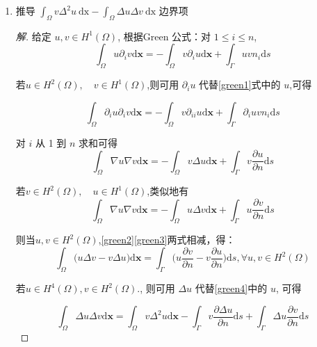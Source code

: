 \documentclass[12pt,a4paper]{article}
\begin{document}
	
	\begin{enumerate}
		\item 推导		
		$
		\displaystyle \int_\Omega v\Delta^2u\mathrm{~dx}-\displaystyle \int_\Omega\Delta u\Delta v\mathrm{~dx}
		$
		边界项
		
		\begin{proof}[解]\let\qed\relax
			给定 $u,v\in H^1(\Omega)$, 根据Green 公式：对 $1\leqslant i\leqslant n$,
			\begin{equation}
				\int_{\Omega}u\partial_{i}v\mathrm{d}\boldsymbol{x}=-\int_{\Omega}v\partial_{i}u\mathrm{d}\boldsymbol{x}+\int_{\Gamma}uvn_{i}\mathrm{d}s\label{green1}
			\end{equation}
			
			若$u\in H^2(\Omega),\quad v\in H^1(\Omega)$,则可用 $\partial_{i}u$ 代替\eqref{green1}式中的 $u$,可得
			
			$$
			\int_{\Omega}\partial_{i}u\partial_{i}v\mathrm{d}\boldsymbol{x}=-\int_{\Omega}v\partial_{ii}u\mathrm{d}\boldsymbol{x}+\int_{\Gamma}\partial_{i}uvn_{i}\mathrm{d}s
			$$
			
			对 $i$ 从 1 到 $n$ 求和可得
			\begin{equation}
				\int_{\Omega}\nabla u\nabla v\mathrm{d}\boldsymbol{x}=-\int_{\Omega}v\Delta u\mathrm{d}\boldsymbol{x}+\int_{\Gamma}v\frac{\partial u}{\partial n}\mathrm{d}s\label{green2}
			\end{equation}
			
			若$v\in H^2(\Omega),\quad u\in H^1(\Omega)$,类似地有
			\begin{equation}
				\int_{\Omega}\nabla u\nabla v\mathrm{d}\boldsymbol{x}=-\int_{\Omega}u\Delta v\mathrm{d}\boldsymbol{x}+\int_{\Gamma}u\frac{\partial v}{\partial n}\mathrm{d}s\label{green3}
			\end{equation}
			
			则当$u, v\in H^2(\Omega)$,\eqref{green2}\eqref{green3}两式相减，得：
			\begin{equation}
				\int_{\Omega}\big(u\Delta v-v\Delta u\big)\mathrm{d}\boldsymbol{x}=\int_{\Gamma}\big(u\frac{\partial v}{\partial n}-v\frac{\partial u}{\partial n}\big)\mathrm{d}s,\forall u,v\in H^{2}(\Omega)\label{green4}
			\end{equation}
			
			若$u\in H^{4}(\Omega),v\in H^{2}(\Omega).$, 则可用 $\Delta u$ 代替\eqref{green4}中的 $u$, 可得
			
			$$
			\int_\Omega\Delta u\Delta v\mathrm{d}\boldsymbol{x}=\int_\Omega v\Delta^2u\mathrm{d}\boldsymbol{x}-\int_\Gamma v\frac{\partial\Delta u}{\partial n}\mathrm{d}s+\int_\Gamma\Delta u\frac{\partial v}{\partial n}\mathrm{d}s
			$$
			

\end{proof}
\end{enumerate}
\end{document}
